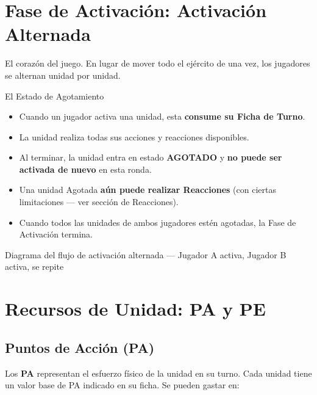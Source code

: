 \section{Fase de Activación: Activación Alternada}

El corazón del juego. En lugar de mover todo el ejército de una vez, los jugadores se alternan unidad por unidad.

\begin{reglaespecial}{El Estado de Agotamiento}
\begin{itemize}
    \item Cuando un jugador activa una unidad, esta \textbf{consume su Ficha de Turno}.
    \item La unidad realiza todas sus acciones y reacciones disponibles.
    \item Al terminar, la unidad entra en estado \textbf{AGOTADO} y \textbf{no puede ser activada de nuevo} en esta ronda.
    \item Una unidad Agotada \textbf{aún puede realizar Reacciones} (con ciertas limitaciones — ver sección de Reacciones).
    \item Cuando todos las unidades de ambos jugadores estén agotadas, la Fase de Activación termina.
\end{itemize}
\end{reglaespecial}

\begin{imagebox}{Diagrama del flujo de activación alternada — Jugador A activa, Jugador B activa, se repite}
    \vspace{2.5cm}
\end{imagebox}

\section{Recursos de Unidad: PA y PE}

\subsection{Puntos de Acción (PA)}

Los \textbf{PA} representan el esfuerzo físico de la unidad en su turno. Cada unidad tiene un valor base de PA indicado en su ficha. Se pueden gastar en:

